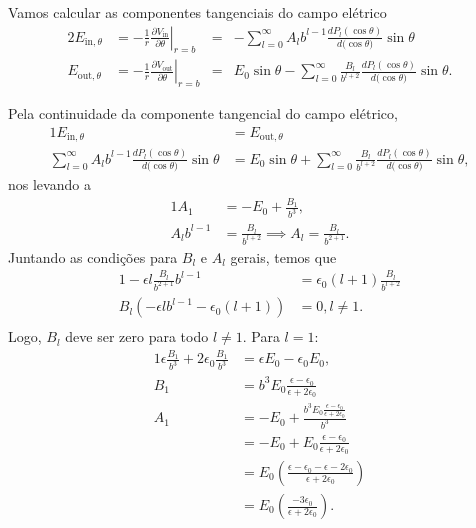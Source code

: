 \documentclass{article}
\begin{document}
Vamos calcular as componentes tangenciais do campo elétrico
\begin{alignat}{2}
 E_{\mathrm{in},\theta} &= \left. - \frac{1}{r}\frac{\partial V_{\mathrm{in}}}{\partial \theta}\right\rvert_{r=b} &=&
 - \sum_{l = 0}^{\infty} A_l b^{l-1} \frac{d P_l(\cos{\theta})}{d(\cos{\theta)}}\sin{\theta} \\
 E_{\mathrm{out},\theta} &= \left. - \frac{1}{r}\frac{\partial V_{\mathrm{out}}}{\partial \theta}\right\rvert_{r=b} &=&
 E_0 \sin{\theta} - \sum_{l = 0}^{\infty} \frac{B_l}{b^{l+2}} \frac{d P_l(\cos{\theta})}{d(\cos{\theta)}}\sin{\theta}\mathrm{.}
\end{alignat}

Pela continuidade da componente tangencial do campo elétrico,
\begin{alignat}{1}
 E_{\mathrm{in},\theta} &= E_{\mathrm{out},\theta} \\
 \sum_{l = 0}^{\infty} A_l b^{l-1} \frac{d P_l(\cos{\theta})}{d(\cos{\theta)}}\sin{\theta} &=
 E_0 \sin{\theta} + \sum_{l = 0}^{\infty} \frac{B_l}{b^{l+2}} \frac{d P_l(\cos{\theta})}{d(\cos{\theta)}}\sin{\theta}\mathrm{,}
\end{alignat}
nos levando a
\begin{alignat}{1}
 A_1 &= - E_0 + \frac{B_1}{b^{3}}\mathrm{,}\\
 A_l b^{l-1} &= \frac{B_l}{b^{l+2}} \implies A_l = \frac{B_l}{b^{2+1}}\mathrm{.}
\end{alignat}
Juntando as condições para $B_l$ e $A_l$ gerais, temos que
\begin{alignat}{1}
 -\epsilon l \frac{B_l}{b^{2+1}} b^{l-1} &= \epsilon_0(l+1)\frac{B_l}{b^{l+2}}\\
 B_l \left( -\epsilon l b^{l-1} - \epsilon_0(l+1) \right) &= 0, l \neq 1\mathrm{.}\\
\end{alignat}
Logo, $B_l$ deve ser zero para todo $l \neq 1$. Para $l = 1$:
\begin{alignat}{1}
 \epsilon \frac{B_1}{b^{3}} + 2 \epsilon_0 \frac{B_1}{b^3} &= \epsilon E_0 - \epsilon_0 E_0 \mathrm{,}\\
 B_1 &= b^3 E_0 \frac{\epsilon - \epsilon_0}{\epsilon + 2\epsilon_0} \\
 A_1 &= - E_0 + \frac{b^3 E_0 \frac{\epsilon - \epsilon_0}{\epsilon + 2\epsilon_0}}{b^{3}}\\
 &= - E_0 + E_0 \frac{\epsilon - \epsilon_0}{\epsilon + 2\epsilon_0}\\
 &= E_0 \left( \frac{\epsilon - \epsilon_0 - \epsilon - 2\epsilon_0}{\epsilon + 2\epsilon_0} \right)\\
 &= E_0 \left( \frac{-3\epsilon_0}{\epsilon + 2\epsilon_0} \right)\mathrm{.}
\end{alignat}
\end{document}
